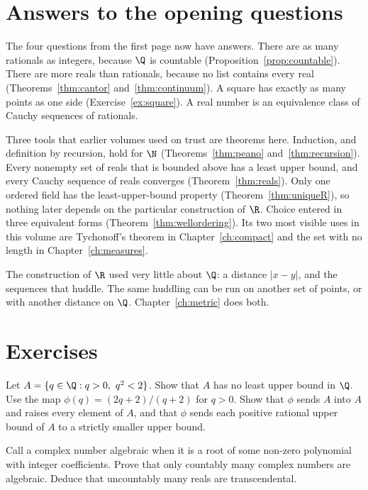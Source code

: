 \section{Answers to the opening questions}

The four questions from the first page now have answers. There are as many rationals as integers, because $\Q$ is countable (Proposition~\ref{prop:countable}). There are more reals than rationals, because no list contains every real (Theorems~\ref{thm:cantor} and~\ref{thm:continuum}). A square has exactly as many points as one side (Exercise~\ref{ex:square}). A real number is an equivalence class of Cauchy sequences of rationals.

Three tools that earlier volumes used on trust are theorems here. Induction, and definition by recursion, hold for $\N$ (Theorems~\ref{thm:peano} and~\ref{thm:recursion}). Every nonempty set of reals that is bounded above has a least upper bound, and every Cauchy sequence of reals converges (Theorem~\ref{thm:reals}). Only one ordered field has the least-upper-bound property (Theorem~\ref{thm:uniqueR}), so nothing later depends on the particular construction of $\R$. Choice entered in three equivalent forms (Theorem~\ref{thm:wellordering}). Its two most visible uses in this volume are Tychonoff's theorem in Chapter~\ref{ch:compact} and the set with no length in Chapter~\ref{ch:measures}.

The construction of $\R$ used very little about $\Q$: a distance $|x-y|$, and the sequences that huddle. The same huddling can be run on another set of points, or with another distance on $\Q$. Chapter~\ref{ch:metric} does both.

\section{Exercises}

\begin{exercise}[$\star$]\label{ex:sqrt2}
Let $A=\{q\in\Q:q>0,\ q^2<2\}$. Show that $A$ has no least upper bound in $\Q$. Use the map $\phi(q)=(2q+2)/(q+2)$ for $q>0$. Show that $\phi$ sends $A$ into $A$ and raises every element of $A$, and that $\phi$ sends each positive rational upper bound of $A$ to a strictly smaller upper bound.
\end{exercise}

\begin{exercise}[$\star$]\label{ex:algebraic}
Call a complex number algebraic when it is a root of some non-zero polynomial with integer coefficients. Prove that only countably many complex numbers are algebraic. Deduce that uncountably many reals are transcendental.
\end{exercise}

